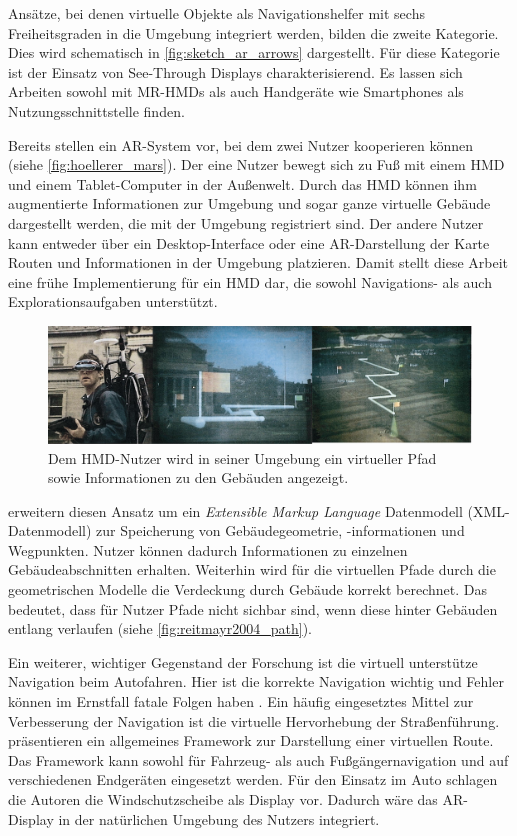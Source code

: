 Ansätze, bei denen virtuelle Objekte als Navigationshelfer mit sechs Freiheitsgraden in die Umgebung integriert werden, bilden die zweite Kategorie.
Dies wird schematisch in \autoref{fig:sketch_ar_arrows} dargestellt.
Für diese Kategorie ist der Einsatz von See-Through Displays charakterisierend.
Es lassen sich Arbeiten sowohl mit MR-HMDs als auch Handgeräte wie Smartphones als Nutzungsschnittstelle finden.

Bereits \textcite{Hoellerer1999} stellen ein AR-System vor, bei dem zwei Nutzer kooperieren können (siehe \autoref{fig:hoellerer_mars}).
Der eine Nutzer bewegt sich zu Fuß mit einem HMD und einem Tablet-Computer in der Außenwelt.
Durch das HMD können ihm augmentierte Informationen zur Umgebung und sogar ganze virtuelle Gebäude dargestellt werden, die mit der Umgebung registriert sind.
Der andere Nutzer kann entweder über ein Desktop-Interface oder eine AR-Darstellung der Karte Routen und Informationen in der Umgebung platzieren.
Damit stellt diese Arbeit eine frühe Implementierung für ein HMD dar, die sowohl Navigations- als auch Explorationsaufgaben unterstützt.
\begin{figure}
    \centering
    \includegraphics[width=\textwidth]{figures/hoellerer_ar_mars}
    \caption{Dem HMD-Nutzer wird in seiner Umgebung ein virtueller Pfad sowie Informationen zu den Gebäuden angezeigt. }
    \label{fig:hoellerer_mars}
\end{figure}

\textcite{Reitmayr2004} erweitern diesen Ansatz um ein \emph{Extensible Markup Language} Datenmodell (XML-Datenmodell) zur Speicherung von Gebäudegeometrie, -informationen und Wegpunkten.
Nutzer können dadurch Informationen zu einzelnen Gebäudeabschnitten erhalten.
Weiterhin wird für die virtuellen Pfade durch die geometrischen Modelle die Verdeckung durch Gebäude korrekt berechnet.
Das bedeutet, dass für Nutzer Pfade nicht sichbar sind, wenn diese hinter Gebäuden entlang verlaufen (siehe \autoref{fig:reitmayr2004_path}).

Ein weiterer, wichtiger Gegenstand der Forschung ist die virtuell unterstütze Navigation beim Autofahren.
Hier ist die korrekte Navigation wichtig und Fehler können im Ernstfall fatale Folgen haben \parencite{Lin2017}.
Ein häufig eingesetztes Mittel zur Verbesserung der Navigation ist die virtuelle Hervorhebung der Straßenführung.
\textcite{Narzt2006} präsentieren ein allgemeines Framework zur Darstellung einer virtuellen Route.
Das Framework kann sowohl für Fahrzeug- als auch Fußgängernavigation und auf verschiedenen Endgeräten eingesetzt werden.
Für den Einsatz im Auto schlagen die Autoren die Windschutzscheibe als Display vor.
Dadurch wäre das AR-Display in der natürlichen Umgebung des Nutzers integriert.

